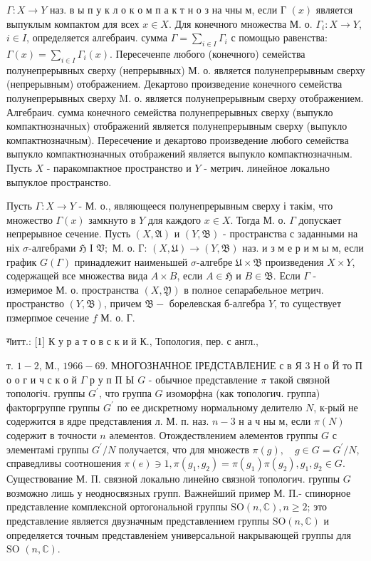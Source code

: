 \documentclass[10pt]{article}
\begin{document}
$\Gamma: X \rightarrow Y$ наз. в ы п у к л о к о м п а к т н о з на чны м, если Г $(x)$ является выпуклым компактом для всех $x \in X$. Для конечного множества М. о. $\Gamma_{i}: X \rightarrow Y$, $i \in I$, определяется алгебраич. сумма $\Gamma=\sum_{i \in I} \Gamma_{i}$ с помощью равенства: $\Gamma(x)=\sum_{i \in I} \Gamma_{i}(x)$. Пересеченпе любого (конечного) семейства полунепрерывных сверху (непрерывных) М. о. является полунепрерывным сверху (непрерывным) отображением. Декартово произведение конечного семейства полунепрерывных сверху M. о. является полунепрерывным сверху отображением. Алгебраич. сумма конечного семейства полунепрерывных сверху (выпукло компактнозначных) отображений является полунепрерывным сверху (выпукло компактнозначным). Пересечение и декартово произведение любого семейства выпукло компактнозначных отображений является выпукло компактнозначным. Пусть $X$ - паракомпактное пространство и $Y$ - метрич. линейное локально выпуклое пространство.



Пусть $\Gamma: X \rightarrow Y$ - М. о., являющееся полунепрерывным сверху і такім, что множество $\Gamma(x)$ замкнуто в $Y$ для каждого $x \in X$. Тогда М. о. $\Gamma$ допускает непрерывное сечение. Пусть $(X, \mathfrak{A})$ и $(Y, \mathfrak{B})$ - пространства с заданными на ніх $\sigma$-алгебрами $\mathfrak{H}$ І $\mathfrak{V} ;$ М. о. Г: $(X, \mathfrak{U}) \rightarrow(Y, \mathfrak{B})$ наз. и з м е р и м ы м, если график $G(\Gamma)$ принадлежит наименьшей $\sigma$-алгебре $\mathfrak{U} \times \mathfrak{B}$ произведения $X \times Y$, содержащей все множества вида $A \times B$, если $A \in \mathfrak{H}$ и $B \in \mathfrak{B}$. Если $\Gamma$ - измеримое М. о. пространства $(X, \mathfrak{Y})$ в полное сепарабельное метрич. пространство $(Y, \mathfrak{B})$, причем $\mathfrak{B}-$ борелевская б-алгебра $Y$, то существует пзмерпмое сечение $f$ М. о. Г.



गитт.: [1] К у р а т о в с к и й К., Топология, пер. с англ.,

т. $1-2$, М., $1966-69$. МНОГОЗНАЧНОЕ ІРЕДСТАВЛЕНИЕ с в Я 3 Н $о$ Й то П о о г и ч с к о й $\Gamma$ р у п П Ы $G$ - обычное представление $\pi$ такой связной топологіч. группы $G^{\prime}$, что группа $G$ изоморфна (как топологич. группа) факторгруппе группы $G^{\prime}$ по ее дискретному нормальному делителю $N$, к-рый не содержится в ядре представления л. М. п. наз. $n-3$ н а ч ны м, если $\pi(N)$ содержит в точности $n$ әлементов. Отождествлением әлементов группы $G$ с элементамі группы $G^{\prime} / N$ получается, что для множеств $\pi(g), \quad g \in G=G^{\prime} / N$, справедливы соотношения $\pi(e) \ni 1, \pi\left(g_{1}, g_{2}\right)=\pi\left(g_{1}\right) \pi\left(g_{2}\right), g_{1}, g_{2} \in G$. Существование М. П. связной локально линейно связной топологич. группы $G$ возможно лишь у неодносвязных групп. Важнейший пример М. П.- спинорное представление комплексной ортогональной группы $\mathrm{SO}(n, \mathbb{C}), n \geqslant 2$; это представление является двузначным представлением группы $\mathrm{SO}(n, \mathbb{C})$ и определяется точным представленіем универсальной накрывающей группы для $\mathrm{SO}$ $(n, \mathbb{C})$.
\end{document}
